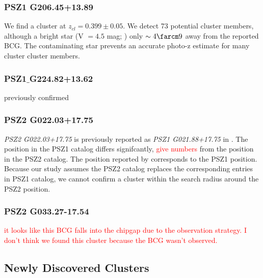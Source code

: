 \documentclass[apj, revtex4]{emulateapj}
\newcommand{\editorial}[1]{\textcolor{red}{#1}}
\begin{document}
\subsubsection{PSZ1 G206.45+13.89}
We find a cluster at $z_{cl} = 0.399 \pm 0.05$. We detect 73 potential cluster members, although a bright star (V $= 4.5$ mag; \citealt{Hog2000}) only $\sim4\farcm9$ away from the reported BCG. The contaminating star prevents an accurate photo-z estimate for many cluster cluster members.

\subsubsection{PSZ1$\_$G224.82+13.62}
previously confirmed

\subsubsection{PSZ2 G022.03+17.75}

\textit{PSZ2 G022.03+17.75} is previously reported as \textit{PSZ1 G021.88+17.75} in \cite{PlanckCollaboration2014}. The position in the PSZ1 catalog differs signifcantly, \editorial{give numbers} from the position in the PSZ2 catalog. The position reported by \cite{Barrena2018} corresponds to the PSZ1 position. Because our study assumes the PSZ2 catalog replaces the corresponding entries in PSZ1 catalog, we cannot confirm a cluster within the search radius around the PSZ2 position.

\subsubsection{PSZ2 G033.27-17.54}
\editorial{it looks like this BCG falls into the chipgap due to the observation strategy. I don't think we found this cluster because the BCG wasn't observed.}


\subsection{Newly Discovered Clusters}

\end{document}
